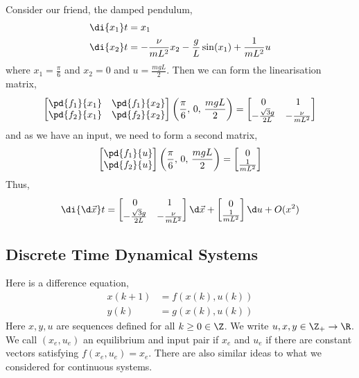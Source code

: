 \begin{eg}
  Consider our friend, the damped pendulum,
  \begin{align*}
    \di {x_1} t &= x_1 \\
    \di {x_2} t &= -\frac{\nu}{mL^2}x_2 - \frac{g }{L}\sin(x_1) + \frac{1}{mL^2}u
  \end{align*}
  where $x_1 = \frac{\pi }{6}$ and $x_2 = 0$ and $u = \frac{mgL }{2}$. Then we can form the linearisation matrix,
  $$ \begin{bmatrix}
    \pd{f_1}{x_1} & \pd{f_1}{x_2}\\
    \pd{f_2}{x_1} & \pd{f_2}{x_2}
  \end{bmatrix} \left(\frac{\pi }{6},\, 0,\, \frac{mgL }{2}\right) = \begin{bmatrix}
    0 & 1 \\ -\frac{\sqrt 3 g }{2L } & -\frac{\nu}{mL^2}
  \end{bmatrix}$$
  and as we have an input, we need to form a second matrix,
  $$ \begin{bmatrix}
    \pd{f_1}{u} \\ \pd{f_2}{u}
  \end{bmatrix} \left(\frac{\pi }{6},\, 0,\, \frac{mgL }{2}\right) = \begin{bmatrix}
    0 \\ \frac{1}{mL^2}
  \end{bmatrix}$$
  Thus,
  $$ \di {\d\vec x} t = \begin{bmatrix}
    0 & 1 \\ -\frac{\sqrt 3 g }{2L } & -\frac{\nu}{mL^2}
  \end{bmatrix} \d\vec{x} + \begin{bmatrix}
    0 \\ \frac{1}{mL^2}
  \end{bmatrix}\d u + O(x^2)$$
\end{eg}

\subsection{Discrete Time Dynamical Systems}
Here is a difference equation,
\begin{align*}
  x(k + 1) &= f(x(k), u(k))\\
  y(k) &= g(x(k), u(k))
\end{align*}
Here $x, y, u$ are sequences defined for all $k \ge 0 \in \Z$. We write $u, x, y \in \Z_+ \to \R$.\\

We call $(x_e, u_e)$ an equilibrium and input pair if $x_e$ and $u_e$ if there are constant vectors satisfying $f(x_e, u_e) = x_e$. There are also similar ideas to what we considered for continuous systems.

